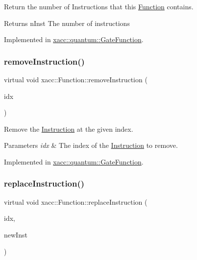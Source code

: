 Return the number of Instructions that this \hyperlink{a02456}{Function} contains.

\begin{DoxyReturn}{Returns}
n\+Inst The number of instructions 
\end{DoxyReturn}


Implemented in \hyperlink{a01272_aa70b26156c060fec71316fe5e98bb102}{xacc\+::quantum\+::\+Gate\+Function}.

\mbox{\label{a02456_ab6478b09bb28e194bb555b3180737733}} 
\subsubsection{\texorpdfstring{remove\+Instruction()}{removeInstruction()}}
{\footnotesize\ttfamily virtual void xacc\+::\+Function\+::remove\+Instruction (\begin{DoxyParamCaption}\item[{const int}]{idx }\end{DoxyParamCaption})\hspace{0.3cm}{\ttfamily [pure virtual]}}

Remove the \hyperlink{a02460}{Instruction} at the given index.


\begin{DoxyParams}{Parameters}
{\em idx} & The index of the \hyperlink{a02460}{Instruction} to remove. \\
\hline
\end{DoxyParams}


Implemented in \hyperlink{a01272_a44ca35d081577de9ad2930f93c01e89d}{xacc\+::quantum\+::\+Gate\+Function}.

\mbox{\label{a02456_a2ef6a4923a6734f90f6ee3d94d263af0}} 
\subsubsection{\texorpdfstring{replace\+Instruction()}{replaceInstruction()}}
{\footnotesize\ttfamily virtual void xacc\+::\+Function\+::replace\+Instruction (\begin{DoxyParamCaption}\item[{const int}]{idx,  }\item[{Inst\+Ptr}]{new\+Inst }\end{DoxyParamCaption})\hspace{0.3cm}{\ttfamily [pure virtual]}}

